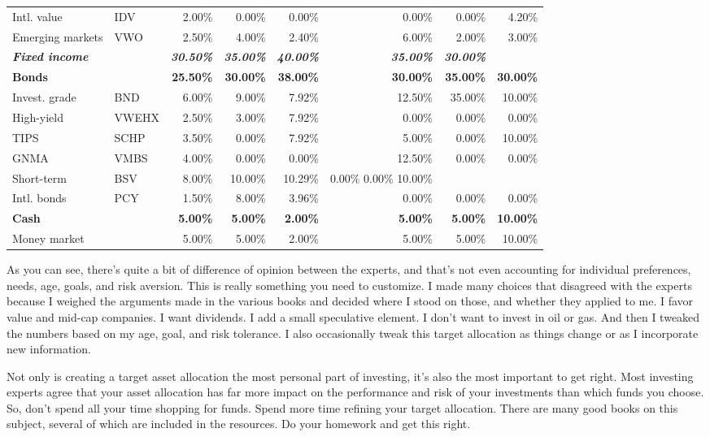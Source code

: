 \begin{table}[ht]
\begin{tabular}{l l r r r r r r}
Intl. value & IDV & 2.00\% & 0.00\% & 0.00\% & 0.00\% & 0.00\% & 4.20\%\\
Emerging markets & VWO & 2.50\% & 4.00\% & 2.40\% & 6.00\% & 2.00\% & 3.00\%\\
\textbf{\emph{Fixed income}} & & \textbf{\emph{30.50\%}} & \textbf{\emph{35.00\%}} & \textbf{\emph{40.00\%}} & \textbf{\emph{35.00\%}} & \textbf{\emph{30.00\%}}\\
\textbf{Bonds} & & \textbf{25.50\%} & \textbf{30.00\%} & \textbf{38.00\%} & \textbf{30.00\%} & \textbf{35.00\%} & \textbf{30.00\%}\\
Invest. grade & BND & 6.00\% & 9.00\% & 7.92\% & 12.50\% & 35.00\% & 10.00\%\\
High-yield & VWEHX & 2.50\% & 3.00\% & 7.92\% & 0.00\% & 0.00\% & 0.00\%\\
TIPS & SCHP & 3.50\% & 0.00\% & 7.92\% & 5.00\% & 0.00\% & 10.00\%\\
GNMA & VMBS & 4.00\% & 0.00\% & 0.00\% & 12.50\% & 0.00\% & 0.00\%\\
Short-term & BSV & 8.00\% & 10.00\% & 10.29\% & 0.00\% 0.00\% 10.00\%\\
Intl. bonds & PCY & 1.50\% & 8.00\% & 3.96\% & 0.00\% & 0.00\% & 0.00\%\\
\textbf{Cash} & & \textbf{5.00\%} & \textbf{5.00\%} & \textbf{2.00\%} & \textbf{5.00\%} & \textbf{5.00\%} & \textbf{10.00\%}\\
Money market & & 5.00\% & 5.00\% & 2.00\% & 5.00\% & 5.00\% & 10.00\%\\
\hline
\end{tabular}
\end{table}

As you can see, there's quite a bit of difference of opinion between the experts, and that's not even accounting for individual preferences, needs, age, goals, and risk aversion. This is really something you need to customize. I made many choices that disagreed with the experts because I weighed the arguments made in the various books and decided where I stood on those, and whether they applied to me. I favor value and mid-cap companies. I want dividends. I add a small speculative element. I don't want to invest in oil or gas. And then I tweaked the numbers based on my age, goal, and risk tolerance. I also occasionally tweak this target allocation as things change or as I incorporate new information.

Not only is creating a target asset allocation the most personal part of investing, it's also the most important to get right. Most investing experts agree that your asset allocation has far more impact on the performance and risk of your investments than which funds you choose. So, don't spend all your time shopping for funds. Spend more time refining your target allocation. There are many good books on this subject, several of which are included in the resources. Do your homework and get this right.

